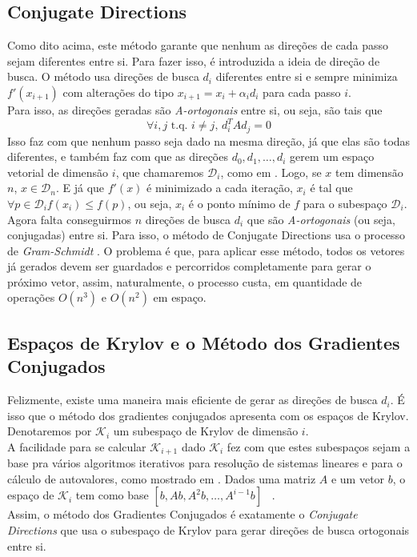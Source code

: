 \documentclass[
10pt, %
a4paper, %
oneside, %
headinclude,footinclude, %
BCOR5mm, %
]{scrartcl}
\begin{document}
\subsection{Conjugate Directions}
Como dito acima, este método garante que nenhum as direções de cada passo sejam diferentes entre si. Para fazer isso, é introduzida a ideia de direção de busca. O método usa direções de busca $d_i$ diferentes entre si e sempre minimiza $f'(x_{i+1})$ com alterações do tipo $x_{i+1} = x_i + \alpha_i d_i$ para cada passo $i$. \\
Para isso, as direções geradas são \textit{A-ortogonais} entre si, ou seja, são tais que 
$$ \forall i,j \text{ t.q. } i \neq j\text{, } d_i^{T}Ad_j = 0 $$
Isso faz com que nenhum passo seja dado na mesma direção, já que elas são todas diferentes, e também faz com que as direções $d_0, d_1, \dots, d_i$ gerem um espaço vetorial de dimensão $i$, que chamaremos $\mathcal{D}_i$, como em \cite{shewchuk1994introduction}. Logo, se $x$ tem dimensão $n$, $x \in \mathcal{D}_n$. E já que $f'(x)$ é minimizado a cada iteração, $x_i$ é tal que $\forall p \in \mathcal{D}_i f(x_i) \leq f(p)$, ou seja, $x_i$ é o ponto mínimo de $f$ para o subespaço $\mathcal{D}_i$. \\
Agora falta conseguirmos $n$ direções de busca ${d_i}$ que são \textit{A-ortogonais} (ou seja, conjugadas) entre si. Para isso, o método de Conjugate Directions usa o processo de \textit{Gram-Schmidt} \cite[p.~25]{shewchuk1994introduction}. O problema é que, para aplicar esse método, todos os vetores já gerados devem ser guardados e percorridos completamente para gerar o próximo vetor, assim, naturalmente, o processo custa, em quantidade de operações $O(n^3)$ e $O(n^2)$ em espaço. \\

\subsection{Espaços de Krylov e o Método dos Gradientes Conjugados}
Felizmente, existe uma maneira mais eficiente de gerar as direções de busca ${d_i}$. É isso que o método dos gradientes conjugados apresenta com os espaços de Krylov. Denotaremos por $\mathcal{K}_i$ um subespaço de Krylov de dimensão $i$. \\
A facilidade para se calcular $\mathcal{K}_{i+1}$ dado $\mathcal{K}_{i}$ fez com que estes subespaços sejam a base pra vários algoritmos iterativos para resolução de sistemas lineares e para o cálculo de autovalores, como mostrado em \cite{trefethen1997numerical}. Dados uma matriz $A$ e um vetor $b$, o espaço de $\mathcal{K}_i$ tem como base $[b, Ab, A^2b, \dots, A^{i-1}b]$ ~\cite[p.~245]{trefethen1997numerical}. \\
Assim, o método dos Gradientes Conjugados é exatamente o \textit{Conjugate Directions} que usa o subespaço de Krylov para gerar direções de busca ortogonais entre si. \\
\end{document}
